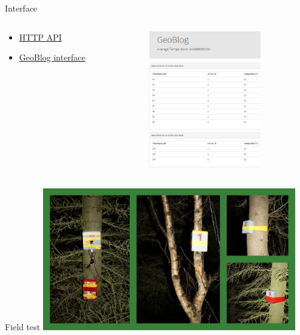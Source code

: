 \documentclass{beamer}
\begin{document}
\begin{frame}{Interface}
\begin{columns}[T] %
     \begin{column}[T]{4cm} %
		
		\begin{itemize}
		\item \href{http://sveinnel.com:5000/geolog}{HTTP API}
		\item \href{http://sveinnel.com:5000/geoblog}{GeoBlog interface}
		\end{itemize}
	\end{column}
     \begin{column}[T]{5cm} %
          \includegraphics[height=6cm]{graphics/GeoBlog.png}
     \end{column}
     \end{columns}
\end{frame}

\begin{frame}{Field test}
\centering
\includegraphics[width=11cm]{graphics/Field_pictures/Field_DataLogger.jpg}
\end{frame}
\end{document}

